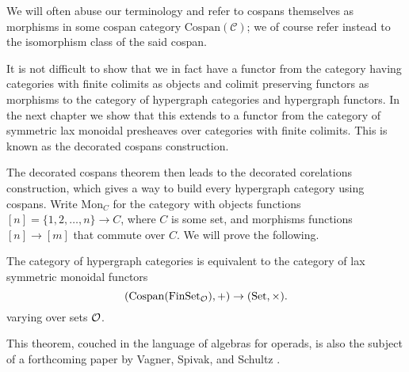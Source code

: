 We will often abuse our terminology and refer to cospans themselves as
morphisms in some cospan category $\mathrm{Cospan}(\mathcal C)$; we of course
refer instead to the isomorphism class of the said cospan.
 
It is not difficult to show that we in fact have a functor from the category
having categories with finite colimits as objects and colimit preserving
functors as morphisms to the category of hypergraph categories and hypergraph
functors. In the next chapter we show that this extends to a functor from the
category of symmetric lax monoidal presheaves over categories with finite
colimits. This is known as the decorated cospans construction.


The decorated cospans theorem then leads to the decorated corelations
construction, which gives a way to build every hypergraph category using
cospans. Write $\mathrm{Mon}_C$ for the category with objects functions $[n]=\{1,2,
\dots,n \} \to C$, where $C$ is some set, and morphisms functions $[n] \to [m]$
that commute over $C$. We will prove the following.
\begin{theorem}
  The category of hypergraph categories is equivalent to the category of
  lax symmetric monoidal functors
  \[
    (\mathrm{Cospan}(\mathrm{FinSet}_{\mathcal O}),+) \to (\mathrm{Set},\times).
  \]
  varying over sets $\mathcal O$.
\end{theorem}
This theorem, couched in the language of algebras for operads, is also the
subject of a forthcoming paper by Vagner, Spivak, and Schultz \cite{VagSpiSch}.



